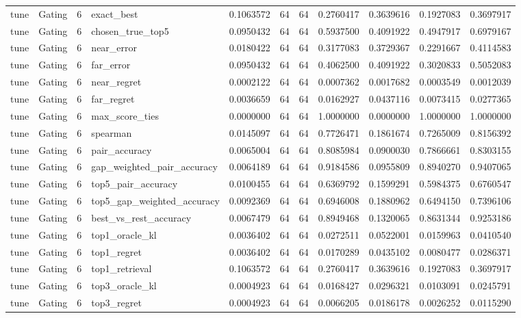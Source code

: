 \begin{tabular}{llrlrrrrrrr}
tune & Gating & 6 & exact_best & 0.1063572 & 64 & 64 & 0.2760417 & 0.3639616 & 0.1927083 & 0.3697917 \\
tune & Gating & 6 & chosen_true_top5 & 0.0950432 & 64 & 64 & 0.5937500 & 0.4091922 & 0.4947917 & 0.6979167 \\
tune & Gating & 6 & near_error & 0.0180422 & 64 & 64 & 0.3177083 & 0.3729367 & 0.2291667 & 0.4114583 \\
tune & Gating & 6 & far_error & 0.0950432 & 64 & 64 & 0.4062500 & 0.4091922 & 0.3020833 & 0.5052083 \\
tune & Gating & 6 & near_regret & 0.0002122 & 64 & 64 & 0.0007362 & 0.0017682 & 0.0003549 & 0.0012039 \\
tune & Gating & 6 & far_regret & 0.0036659 & 64 & 64 & 0.0162927 & 0.0437116 & 0.0073415 & 0.0277365 \\
tune & Gating & 6 & max_score_ties & 0.0000000 & 64 & 64 & 1.0000000 & 0.0000000 & 1.0000000 & 1.0000000 \\
tune & Gating & 6 & spearman & 0.0145097 & 64 & 64 & 0.7726471 & 0.1861674 & 0.7265009 & 0.8156392 \\
tune & Gating & 6 & pair_accuracy & 0.0065004 & 64 & 64 & 0.8085984 & 0.0900030 & 0.7866661 & 0.8303155 \\
tune & Gating & 6 & gap_weighted_pair_accuracy & 0.0064189 & 64 & 64 & 0.9184586 & 0.0955809 & 0.8940270 & 0.9407065 \\
tune & Gating & 6 & top5_pair_accuracy & 0.0100455 & 64 & 64 & 0.6369792 & 0.1599291 & 0.5984375 & 0.6760547 \\
tune & Gating & 6 & top5_gap_weighted_accuracy & 0.0092369 & 64 & 64 & 0.6946008 & 0.1880962 & 0.6494150 & 0.7396106 \\
tune & Gating & 6 & best_vs_rest_accuracy & 0.0067479 & 64 & 64 & 0.8949468 & 0.1320065 & 0.8631344 & 0.9253186 \\
tune & Gating & 6 & top1_oracle_kl & 0.0036402 & 64 & 64 & 0.0272511 & 0.0522001 & 0.0159963 & 0.0410540 \\
tune & Gating & 6 & top1_regret & 0.0036402 & 64 & 64 & 0.0170289 & 0.0435102 & 0.0080477 & 0.0286371 \\
tune & Gating & 6 & top1_retrieval & 0.1063572 & 64 & 64 & 0.2760417 & 0.3639616 & 0.1927083 & 0.3697917 \\
tune & Gating & 6 & top3_oracle_kl & 0.0004923 & 64 & 64 & 0.0168427 & 0.0296321 & 0.0103091 & 0.0245791 \\
tune & Gating & 6 & top3_regret & 0.0004923 & 64 & 64 & 0.0066205 & 0.0186178 & 0.0026252 & 0.0115290 \\

\end{tabular}
